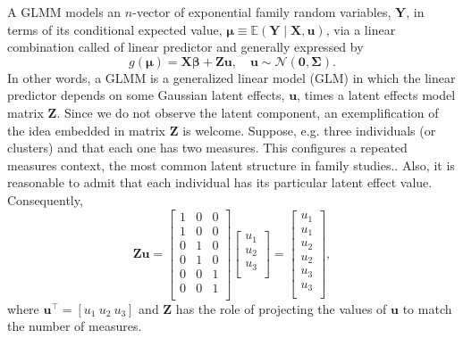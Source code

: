 A GLMM models an \(n\)-vector of exponential family random variables,
\(\mathbf{Y}\), in terms of its conditional expected value, \(\bm{\mu}
\equiv \mathbb{E}(\mathbf{Y} \mid \mathbf{X}, \mathbf{u})\), via a
linear combination called of linear predictor and generally expressed by
\begin{equation}
  g(\bm{\mu}) = \mathbf{X} \bm{\beta} + \mathbf{Zu}, \quad
  \mathbf{u} \sim \mathcal{N}(\mathbf{0}, \bm{\Sigma}).
  \label{eq:gmu}
\end{equation}
In other words, a GLMM is a generalized linear model (GLM) in which the
linear predictor depends on some Gaussian latent effects,
\(\mathbf{u}\), times a latent effects model matrix \(\mathbf{Z}\).
Since we do not observe the latent component, an exemplification of the
idea embedded in matrix \(\mathbf{Z}\) is welcome. Suppose, e.g. three
individuals (or clusters) and that each one has two measures. This
configures a repeated measures context, the most common latent structure
in family studies.. Also, it is reasonable to admit that each individual
has its particular latent effect value. Consequently,
\[
  \mathbf{Zu} = \begin{bmatrix}
                 1 & 0 & 0\\1 & 0 & 0\\
                 0 & 1 & 0\\0 & 1 & 0\\
                 0 & 0 & 1\\0 & 0 & 1\\
                \end{bmatrix} \begin{bmatrix}
                               u_{1}\\u_{2}\\u_{3}\\
                              \end{bmatrix} = \begin{bmatrix}
                                               u_{1}\\u_{1}\\
                                               u_{2}\\u_{2}\\
                                               u_{3}\\u_{3}\\
                                              \end{bmatrix},
\]
where \(\mathbf{u}^{\top} = [u_{1}~u_{2}~u_{3}]\) and \(\mathbf{Z}\) has
the role of projecting the values of \(\mathbf{u}\) to match the number
of measures.

